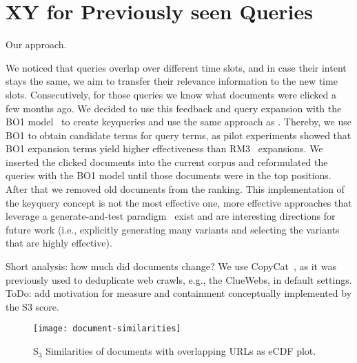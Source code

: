 \section{XY for Previously seen Queries}

Our approach.

We noticed that queries overlap over different time slots, and in case their intent stays the same, we aim to transfer their relevance information to the new time slots. Consecutively, for those queries we know what documents were clicked a few months ago. We decided to use this feedback and query expansion with the BO1 model~\cite{amati:2003} to create keyqueries and use the same approach as \cite{froebe-mis:2022}. Thereby, we use BO1 to obtain candidate terms for query terms, as pilot experiments showed that BO1 expansion terms yield higher effectiveness than RM3~\cite{jaleel:2004} expansions. We inserted the clicked documents into the current corpus and reformulated the queries with the BO1 model until those documents were in the top positions. After that we removed old documents from the ranking. This implementation of the keyquery concept is not the most effective one, more effective approaches that leverage a generate-and-test paradigm~\cite{froebe:2021c} exist and are interesting directions for future work (i.e., explicitly generating many variants and selecting the variants that are highly effective).

Short analysis: how much did documents change? We use CopyCat~\cite{froebe:2021a}, as it was previously used to deduplicate web crawls, e.g., the ClueWebs, in default settings. ToDo: add motivation for measure and containment conceptually implemented by the S3 score.

\begin{figure}[t]
\texttt{[image: document-similarities]}
\vspace{-4ex}
\caption{S$_{3}$ Similarities of documents with overlapping URLs as eCDF plot.}
\label{fig:document-similarities}
\end{figure}

